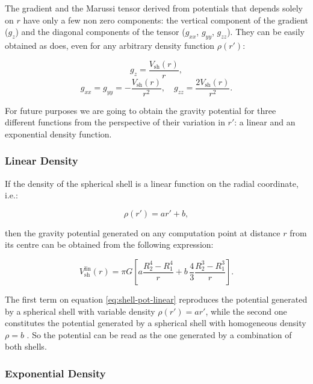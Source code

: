 \documentclass[extra]{gji}
\begin{document}
The gradient and the Marussi tensor derived from potentials that depends solely on $r$ have only a few non zero components: the vertical component of the gradient ($g_z$) and the diagonal components of the tensor ($g_{xx}$, $g_{yy}$, $g_{zz}$).
They can be easily obtained as \citet{Grombein2013} does, even for any arbitrary density function $\rho(r')$:

\begin{equation}
    g_z = \frac{V_\text{sh}(r)}{r},
\end{equation}
\begin{equation}
    g_{xx} = g_{yy} = -\frac{V_\text{sh}(r)}{r^2}, \quad
    g_{zz} = \frac{2V_\text{sh}(r)}{r^2}.
\end{equation}

For future purposes we are going to obtain the gravity potential for three different functions from the perspective of their variation in $r'$: a linear and an exponential density function.


\subsubsection{Linear Density}

If the density of the spherical shell is a linear function on the radial coordinate, i.e.:

\begin{equation}
    \rho(r') = ar' + b,
\end{equation}

\noindent then the gravity potential generated on any computation point at distance $r$ from its centre can be obtained from the following expression:

\begin{equation}
    V_\text{sh}^\text{lin}(r) = \pi G \left[ 
    a \frac{R_2^4 - R_1^4}{r} +
    b \,\frac{4}{3} \frac{R_2^3 - R_1^3}{r} \right].
    \label{eq:shell-pot-linear}
\end{equation}

The first term on equation \ref{eq:shell-pot-linear} reproduces the potential generated by a spherical shell with variable density $\rho(r') = ar'$, while the second one constitutes the potential generated by a spherical shell with homogeneous density $\rho = b$ \citep{Mikuska2006,Grombein2013}.
So the potential can be read as the one generated by a combination of both shells.


\subsubsection{Exponential Density}
\end{document}
